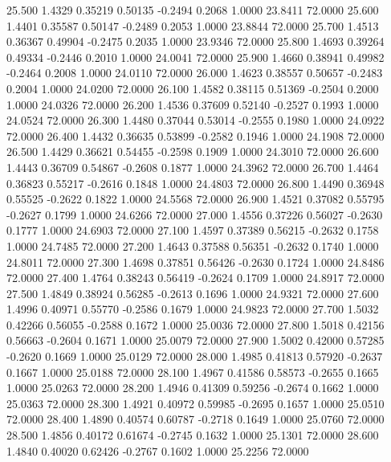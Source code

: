   25.500   1.4329   0.35219   0.50135  -0.2494   0.2068   1.0000  23.8411  72.0000
  25.600   1.4401   0.35587   0.50147  -0.2489   0.2053   1.0000  23.8844  72.0000
  25.700   1.4513   0.36367   0.49904  -0.2475   0.2035   1.0000  23.9346  72.0000
  25.800   1.4693   0.39264   0.49334  -0.2446   0.2010   1.0000  24.0041  72.0000
  25.900   1.4660   0.38941   0.49982  -0.2464   0.2008   1.0000  24.0110  72.0000
  26.000   1.4623   0.38557   0.50657  -0.2483   0.2004   1.0000  24.0200  72.0000
  26.100   1.4582   0.38115   0.51369  -0.2504   0.2000   1.0000  24.0326  72.0000
  26.200   1.4536   0.37609   0.52140  -0.2527   0.1993   1.0000  24.0524  72.0000
  26.300   1.4480   0.37044   0.53014  -0.2555   0.1980   1.0000  24.0922  72.0000
  26.400   1.4432   0.36635   0.53899  -0.2582   0.1946   1.0000  24.1908  72.0000
  26.500   1.4429   0.36621   0.54455  -0.2598   0.1909   1.0000  24.3010  72.0000
  26.600   1.4443   0.36709   0.54867  -0.2608   0.1877   1.0000  24.3962  72.0000
  26.700   1.4464   0.36823   0.55217  -0.2616   0.1848   1.0000  24.4803  72.0000
  26.800   1.4490   0.36948   0.55525  -0.2622   0.1822   1.0000  24.5568  72.0000
  26.900   1.4521   0.37082   0.55795  -0.2627   0.1799   1.0000  24.6266  72.0000
  27.000   1.4556   0.37226   0.56027  -0.2630   0.1777   1.0000  24.6903  72.0000
  27.100   1.4597   0.37389   0.56215  -0.2632   0.1758   1.0000  24.7485  72.0000
  27.200   1.4643   0.37588   0.56351  -0.2632   0.1740   1.0000  24.8011  72.0000
  27.300   1.4698   0.37851   0.56426  -0.2630   0.1724   1.0000  24.8486  72.0000
  27.400   1.4764   0.38243   0.56419  -0.2624   0.1709   1.0000  24.8917  72.0000
  27.500   1.4849   0.38924   0.56285  -0.2613   0.1696   1.0000  24.9321  72.0000
  27.600   1.4996   0.40971   0.55770  -0.2586   0.1679   1.0000  24.9823  72.0000
  27.700   1.5032   0.42266   0.56055  -0.2588   0.1672   1.0000  25.0036  72.0000
  27.800   1.5018   0.42156   0.56663  -0.2604   0.1671   1.0000  25.0079  72.0000
  27.900   1.5002   0.42000   0.57285  -0.2620   0.1669   1.0000  25.0129  72.0000
  28.000   1.4985   0.41813   0.57920  -0.2637   0.1667   1.0000  25.0188  72.0000
  28.100   1.4967   0.41586   0.58573  -0.2655   0.1665   1.0000  25.0263  72.0000
  28.200   1.4946   0.41309   0.59256  -0.2674   0.1662   1.0000  25.0363  72.0000
  28.300   1.4921   0.40972   0.59985  -0.2695   0.1657   1.0000  25.0510  72.0000
  28.400   1.4890   0.40574   0.60787  -0.2718   0.1649   1.0000  25.0760  72.0000
  28.500   1.4856   0.40172   0.61674  -0.2745   0.1632   1.0000  25.1301  72.0000
  28.600   1.4840   0.40020   0.62426  -0.2767   0.1602   1.0000  25.2256  72.0000
